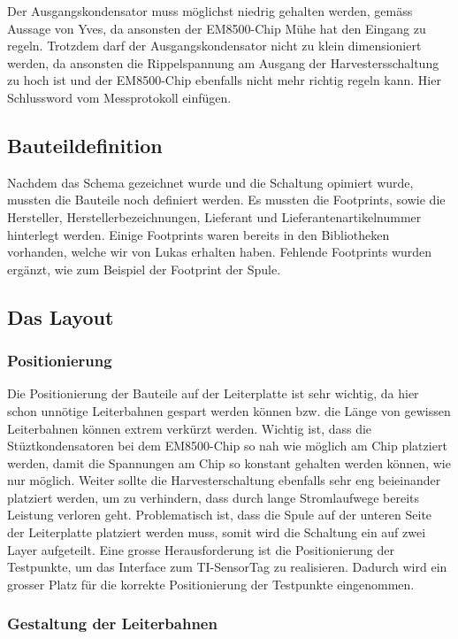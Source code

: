 Der Ausgangskondensator muss möglichst niedrig gehalten werden, gemäss Aussage von Yves, da ansonsten der EM8500-Chip Mühe hat den Eingang zu regeln. Trotzdem darf der Ausgangskondensator nicht zu klein dimensioniert werden, da ansonsten die Rippelspannung am Ausgang der Harvestersschaltung zu hoch ist und der EM8500-Chip ebenfalls nicht mehr richtig regeln kann.
Hier Schlussword vom Messprotokoll einfügen.


\subsection{Bauteildefinition}

Nachdem das Schema gezeichnet wurde und die Schaltung opimiert wurde, mussten die Bauteile noch definiert werden. Es mussten die Footprints, sowie die Hersteller, Herstellerbezeichnungen, Lieferant und Lieferantenartikelnummer hinterlegt werden. Einige Footprints waren bereits in den Bibliotheken vorhanden, welche wir von Lukas erhalten haben. Fehlende Footprints wurden ergänzt, wie zum Beispiel der Footprint der Spule.


\subsection{Das Layout}

\subsubsection{Positionierung}
Die Positionierung der Bauteile auf der Leiterplatte ist sehr wichtig, da hier schon unnötige Leiterbahnen gespart werden können bzw. die Länge von gewissen Leiterbahnen können extrem verkürzt werden.
Wichtig ist, dass die Stüztkondensatoren bei dem EM8500-Chip so nah wie möglich am Chip platziert werden, damit die Spannungen am Chip so konstant gehalten werden können, wie nur möglich.
Weiter sollte die Harvesterschaltung ebenfalls sehr eng beieinander platziert werden, um zu verhindern, dass durch lange Stromlaufwege bereits Leistung verloren geht. Problematisch ist, dass die Spule auf der unteren Seite der Leiterplatte platziert werden muss, somit wird die Schaltung ein auf zwei Layer aufgeteilt.
Eine grosse Herausforderung ist die Positionierung der Testpunkte, um das Interface zum TI-SensorTag zu realisieren. Dadurch wird ein grosser Platz für die korrekte Positionierung der Testpunkte eingenommen.

\subsubsection{Gestaltung der Leiterbahnen}

